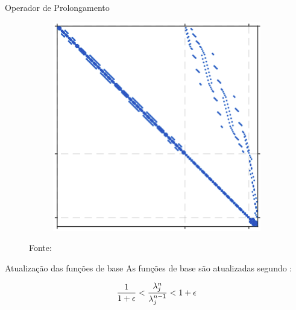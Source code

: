 \documentclass[professionalfont]{beamer}
\begin{document}
\begin{frame}{Operador de Prolongamento}
\begin{figure}[!ht]
\begin{subfigure}{.3\textwidth}
            \subcaption{\finewirebasketMatrix}
            \label{fig:multiescala.4.b}
        \end{subfigure}
        \begin{subfigure}{.3\textwidth}
            \centering
            \includegraphics[scale=0.27]{./imgs/im12.png}
            \subcaption{$\finewirebasketMatrixMod$}
            \label{fig:multiescala.4.c}
        \end{subfigure}
        
        {\footnotesize Fonte:\cite{Magri2015}}
        \label{fig:multiescala.4}
    \end{figure}

\end{frame}

\begin{frame}{Atualização das funções de base}
    As funções de base são atualizadas segundo : 
    

\begin{equation}
    \dfrac{1}{1+\epsilon} < \dfrac{\lambda_{j}^{n}}{\lambda_{j}^{n-1}}  < 1 + \epsilon  
    \label{eq:update_bf.1}
\end{equation}
\end{frame}
\end{document}
